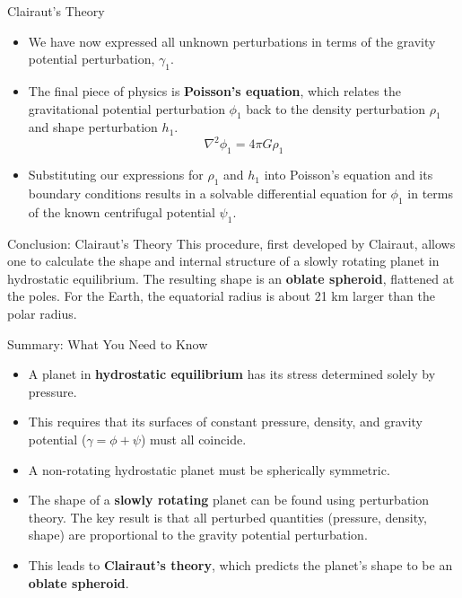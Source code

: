 \documentclass{beamer}
\begin{document}
\begin{frame}{Clairaut's Theory}
    \begin{itemize}
        \item We have now expressed all unknown perturbations in terms of the gravity potential perturbation, $\gamma_1$.
        \pause
        \item The final piece of physics is \textbf{Poisson's equation}, which relates the gravitational potential perturbation $\phi_1$ back to the density perturbation $\rho_1$ and shape perturbation $h_1$.
        $$ \nabla^2\phi_1 = 4\pi G \rho_1 $$
        \pause
        \item Substituting our expressions for $\rho_1$ and $h_1$ into Poisson's equation and its boundary conditions results in a solvable differential equation for $\phi_1$ in terms of the known centrifugal potential $\psi_1$.
    \end{itemize}
    \pause
    \begin{block}{Conclusion: Clairaut's Theory}
        This procedure, first developed by Clairaut, allows one to calculate the shape and internal structure of a slowly rotating planet in hydrostatic equilibrium. The resulting shape is an \textbf{oblate spheroid}, flattened at the poles. For the Earth, the equatorial radius is about 21 km larger than the polar radius.
    \end{block}
\end{frame}


\begin{frame}{Summary: What You Need to Know}
    \begin{itemize}
        \item A planet in \textbf{hydrostatic equilibrium} has its stress determined solely by pressure.
        \pause
        \item This requires that its surfaces of constant pressure, density, and gravity potential ($\gamma = \phi + \psi$) must all coincide.
        \pause
        \item A non-rotating hydrostatic planet must be spherically symmetric.
        \pause
        \item The shape of a \textbf{slowly rotating} planet can be found using perturbation theory. The key result is that all perturbed quantities (pressure, density, shape) are proportional to the gravity potential perturbation.
        \pause
        \item This leads to \textbf{Clairaut's theory}, which predicts the planet's shape to be an \textbf{oblate spheroid}.
    \end{itemize}
\end{frame}
\end{document}
